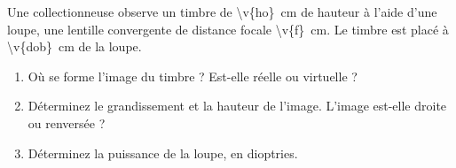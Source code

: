 Une collectionneuse observe un timbre de \qty{\v{ho}}{cm} de hauteur à l'aide d'une loupe, une lentille convergente de distance focale \qty{\v{f}}{cm}. Le timbre est placé à \qty{\v{dob}}{cm} de la loupe.

\begin{enumerate}[label=\alph*)]
    \item Où se forme l'image du timbre ? Est-elle réelle ou virtuelle ?
    \item Déterminez le grandissement et la hauteur de l'image. L'image est-elle droite ou renversée ?
    \item Déterminez la puissance de la loupe, en dioptries.
\end{enumerate}

